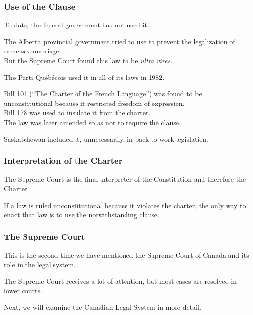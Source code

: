 \begin{frame}
\frametitle{Use of the Clause}

To date, the federal government has not used it.

The Alberta provincial government tried to use to prevent the legalization of same-sex marriage.\\
\quad But the Supreme Court found this law to be \textit{ultra vires}.

The Parti Qu\'eb\'ecois used it in all of its laws in 1982.

Bill 101 (``The Charter of the French Language'') was found to be unconstitutional because it restricted freedom of expression.\\
\quad Bill 178 was used to insulate it from the charter.\\
\quad The law was later amended so as not to require the clause.

Saskatchewan included it, unnecessarily, in back-to-work legislation.

\end{frame}



\begin{frame}
\frametitle{Interpretation of the Charter}

The Supreme Court is the final interpreter of the Constitution and therefore the Charter.

If a law is ruled unconstitutional because it violates the charter, the only way to enact that law is to use the notwithstanding clause.


\end{frame}



\begin{frame}
\frametitle{The Supreme Court}

This is the second time we have mentioned the Supreme Court of Canada and its role in the legal system.

The Supreme Court receives a lot of attention, but most cases are resolved in lower courts.

Next, we will examine the Canadian Legal System in more detail.

\end{frame}




